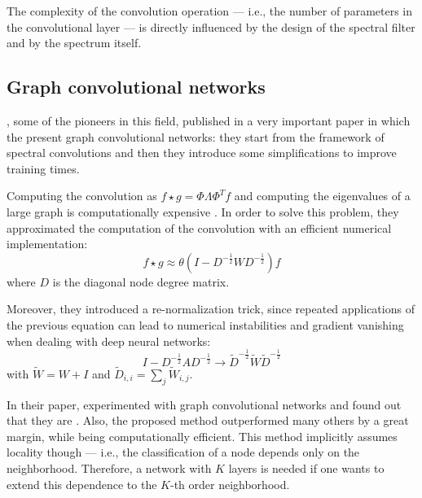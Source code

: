             The complexity of the convolution operation --- i.e., the number of parameters in the convolutional layer --- is directly influenced by the design of the spectral filter and by the spectrum itself.
        \subsection{Graph convolutional networks}\label{gcn}
            \citeauthor{Kipf}, some of the pioneers in this field, published in \citeyear{Kipf} a very important paper \cite{Kipf} in which the present graph convolutional networks: they start from the framework of spectral convolutions and then they introduce some simplifications to improve training times.
            
            Computing the convolution as \(f \star g = \Phi \Lambda \Phi^T f\) and computing the eigenvalues of a large graph is computationally expensive \cite{Kipf}. In order to solve this problem, they approximated the computation of the convolution with an efficient numerical implementation:
            \[f \star g \approx \theta \left(I - D^{-\frac{1}{2}} W D^{-\frac{1}{2}}\right)f\]
            where \(D\) is the diagonal node degree matrix.
            
            Moreover, they introduced a re-normalization trick, since repeated applications of the previous equation can lead to numerical instabilities and gradient vanishing when dealing with deep neural networks:
            \[I - D^{-\frac{1}{2}} A D^{-\frac{1}{2}} \rightarrow \tilde{D}^{-\frac{1}{2}} \tilde{W} \tilde{D}^{-\frac{1}{2}}\]
            with \(\tilde{W} = W + I\) and \(\tilde{D}_{i,i} = \sum_{j}\tilde{W}_{i,j}\).
            
            In their paper, \citeauthor{Kipf} experimented with graph convolutional networks and found out that they are  \cite{Kipf}. Also, the proposed method outperformed many others by a great margin, while being computationally efficient. This method implicitly assumes locality though --- i.e., the classification of a node depends only on the neighborhood. Therefore, a network with \(K\) layers is needed if one wants to extend this dependence to the \(K\)-th order neighborhood. 